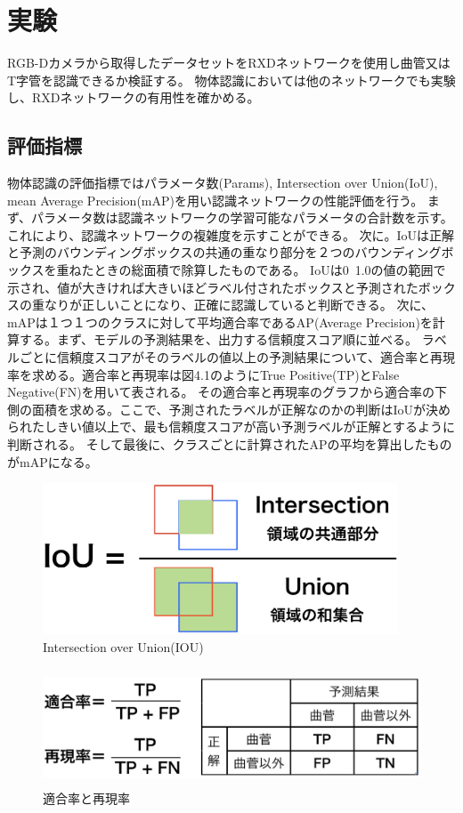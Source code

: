 ﻿\chapter{%
実験}

RGB-Dカメラから取得したデータセットをRXDネットワークを使用し曲管又はT字管を認識できるか検証する。
物体認識においては他のネットワークでも実験し、RXDネットワークの有用性を確かめる。

\section{評価指標}
物体認識の評価指標ではパラメータ数(Params), Intersection over Union(IoU), mean Average Precision(mAP)を用い認識ネットワークの性能評価を行う。
まず、パラメータ数は認識ネットワークの学習可能なパラメータの合計数を示す。これにより、認識ネットワークの複雑度を示すことができる。
次に。IoUは正解と予測のバウンディングボックスの共通の重なり部分を２つのバウンディングボックスを重ねたときの総面積で除算したものである。
IoUは0~1.0の値の範囲で示され、値が大きければ大きいほどラベル付されたボックスと予測されたボックスの重なりが正しいことになり、正確に認識していると判断できる。
次に、mAPは１つ１つのクラスに対して平均適合率であるAP(Average Precision)を計算する。まず、モデルの予測結果を、出力する信頼度スコア順に並べる。
ラベルごとに信頼度スコアがそのラベルの値以上の予測結果について、適合率と再現率を求める。適合率と再現率は図4.1のようにTrue Positive(TP)とFalse Negative(FN)を用いて表される。
その適合率と再現率のグラフから適合率の下側の面積を求める。ここで、予測されたラベルが正解なのかの判断はIoUが決められたしきい値以上で、最も信頼度スコアが高い予測ラベルが正解とするように判断される。
そして最後に、クラスごとに計算されたAPの平均を算出したものがmAPになる。

\begin{figure}[htbt]
	\centering
	 \includegraphics[height=45mm]{iou.eps}
	 \caption{Intersection over Union(IOU)}
	 \label{fig:f2}
\end{figure}

\begin{figure}[htbt]
	\centering
	 \includegraphics[height=35mm]{recall.eps}
	 \caption{適合率と再現率}
	 \label{fig:f2}
\end{figure}


